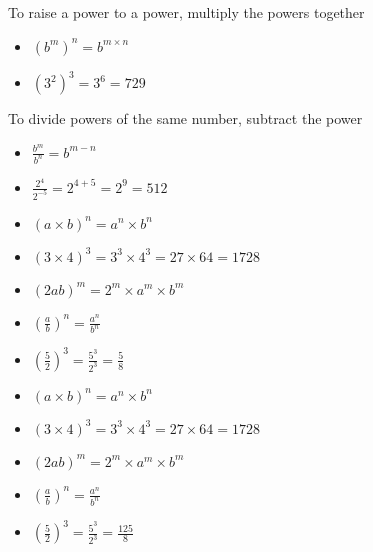 \begin{frame}
To raise a power to a power, multiply the powers together
\begin{itemize}
	\item $	(b^m)^n  =  b^{m \times n} $
	\item $(3^2)^3  =  3^6 = 729$
\end{itemize}
\end{frame}
\begin{frame}
To divide powers of the same number, subtract the power
\begin{itemize}
	\item $	\frac{b^m}{b^n}  =  b^{m-n}$
	\item $	\frac{2^4}{2^{-5}}  =  2^{4+5} = 2^9 = 512$
\end{itemize}
\end{frame}
\begin{frame}
\begin{itemize}
	\item $(a \times b)^n  =  a^n \times b^n$
	\item $(3 \times 4)^3  =  3^3 \times  4^3  =  27 \times  64  =  1728$
	\item $(2ab)^m  =  2^m \times  a^m \times  b^m$
	\item $(\frac{a}{b})^n  =  \frac{a^n}{b^n}$
	\item $(\frac{5}{2})^3  =  \frac{5^3}{2^3} = \frac{5}{8}$
\end{itemize}
\end{frame}
\begin{frame}
\begin{itemize}
	\item $(a \times b)^n  =  a^n \times b^n$
	\item $(3 \times 4)^3  =  3^3 \times  4^3  =  27 \times  64  =  1728$
	\item $(2ab)^m  =  2^m \times  a^m \times  b^m$
	\item $(\frac{a}{b})^n  =  \frac{a^n}{b^n}$
	\item $(\frac{5}{2})^3  =  \frac{5^3}{2^3} = \frac{125}{8}$
\end{itemize}
\end{frame}
